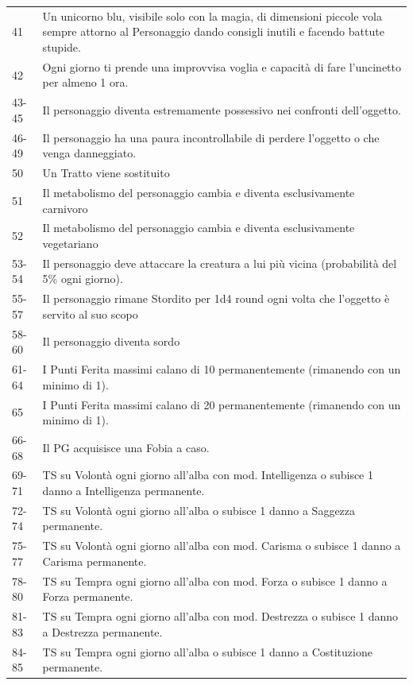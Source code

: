 \begin{tabularx}{\linewidth}{lX}
41& Un unicorno blu, visibile solo con la magia, di dimensioni piccole vola sempre attorno al Personaggio dando consigli inutili e facendo battute stupide.\\
\rowcolor{gray!20}42& Ogni giorno ti prende una improvvisa voglia e capacità di fare l'uncinetto per almeno 1 ora.\\
43-45 & Il personaggio diventa estremamente possessivo nei confronti dell'oggetto.\\
\rowcolor{gray!20}46-49 & Il personaggio ha una paura incontrollabile di perdere l'oggetto o che venga danneggiato.\\
50& Un Tratto viene sostituito\\
\rowcolor{gray!20}51& Il metabolismo del personaggio cambia e diventa esclusivamente carnivoro\\
52& Il metabolismo del personaggio cambia e diventa esclusivamente vegetariano\\
\rowcolor{gray!20}53-54 & Il personaggio deve attaccare la creatura a lui più vicina (probabilità del 5\% ogni giorno).\\
55-57 & Il personaggio rimane Stordito per 1d4 round ogni volta che l'oggetto è servito al suo scopo\\
\rowcolor{gray!20}58-60 & Il personaggio diventa sordo\\
61-64 & I Punti Ferita massimi calano di 10 permanentemente (rimanendo con un minimo di 1).\\
\rowcolor{gray!20}65& I Punti Ferita massimi calano di 20 permanentemente (rimanendo con un minimo di 1).\\
66-68 & Il PG acquisisce una Fobia a caso.\\
\rowcolor{gray!20}69-71 & TS su Volontà ogni giorno all'alba con mod. Intelligenza o subisce 1 danno a Intelligenza permanente.\\
72-74 & TS su Volontà ogni giorno all'alba o subisce 1 danno a Saggezza permanente.\\
\rowcolor{gray!20}75-77 & TS su Volontà ogni giorno all'alba con mod. Carisma o subisce 1 danno a Carisma permanente.\\
78-80 & TS su Tempra ogni giorno all'alba con mod. Forza o subisce 1 danno a Forza permanente.\\
\rowcolor{gray!20}81-83 & TS su Tempra ogni giorno all'alba con mod. Destrezza o subisce 1 danno a Destrezza permanente.\\
84-85 & TS su Tempra ogni giorno all'alba o subisce 1 danno a Costituzione permanente.\\

\end{tabularx}
